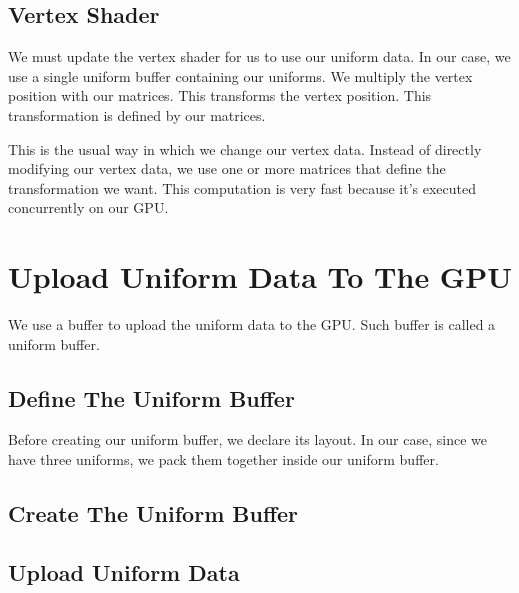 \subsection{Vertex Shader}

We must update the vertex shader for us to use our uniform data.
In our case, we use a single uniform buffer containing our uniforms.
We multiply the vertex position with our matrices.
This transforms the vertex position.
This transformation is defined by our matrices.

This is the usual way in which we change our vertex data.
Instead of directly modifying our vertex data, we use one or more matrices
that define the transformation we want.
This computation is very fast because it's executed concurrently on our GPU.

\begin{minipage}{\linewidth}{\noindent}
    
\end{minipage}

\section{Upload Uniform Data To The GPU}

We use a buffer to upload the uniform data to the GPU.
Such buffer is called a uniform buffer.

\subsection{Define The Uniform Buffer}

Before creating our uniform buffer, we declare its layout.
In our case, since we have three uniforms, we pack them
together inside our uniform buffer.

\begin{minipage}{\linewidth}{\noindent}
    
\end{minipage}

\subsection{Create The Uniform Buffer}

\subsection{Upload Uniform Data}

